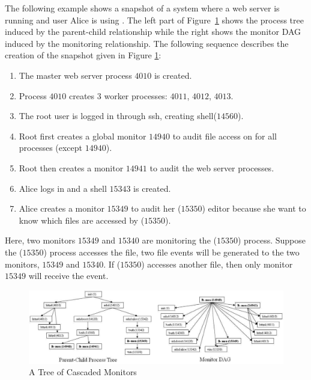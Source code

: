 The following example shows a snapshot of a system where a web server is running
and user Alice is using .
The left part of Figure~\ref{fig:lbox-mon-tree} shows the process tree induced
by the parent-child relationship while the right
shows the monitor DAG induced by the monitoring relationship.
The following sequence describes the creation of the snapshot given
in Figure \ref{fig:lbox-mon-tree}:

\begin{enumerate}
\item The master web server process $4010$ is created.
\item Process $4010$ creates 3 worker processes:
$4011$, $4012$, $4013$.
\item The root user is logged in through ssh, creating shell($14560$).
\item Root first creates a global monitor $14940$ to audit
file access on  for all processes (except $14940$).
\item Root then creates a monitor $14941$ to audit the web server processes.
\item Alice logs in and a shell $15343$ is created.
\item Alice creates a monitor $15349$ to audit her ($15350$) editor
because she want to know which files are accessed by ($15350$).
\end{enumerate}

Here, two monitors $15349$ and $15340$ are monitoring the
($15350$) process. 
Suppose the  ($15350$) 
process accesses the  file, 
two file events will be generated to the two monitors, $15349$ and $15340$.
If  ($15350$) accesses another file, then only
monitor $15349$ will receive the event.

\begin{figure}
\includegraphics[width=1.0\textwidth]{lbox/mon-both}
\caption{A Tree of Cascaded Monitors}
\label{fig:lbox-mon-tree}
\end{figure}


